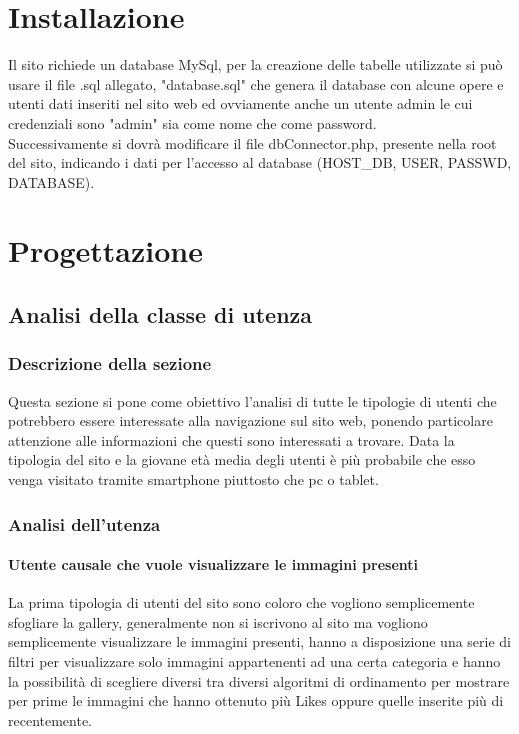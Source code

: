 \documentclass[openany, a4paper, 12pt]{report}
\begin{document}
	\chapter{Installazione}
	Il sito richiede un database MySql, per la creazione delle tabelle utilizzate si può usare il file .sql allegato, "database.sql" che genera il database con alcune opere e utenti dati inseriti nel sito web ed ovviamente anche un utente admin le cui credenziali sono "admin" sia come nome che come password.\\
	Successivamente si dovrà modificare il file dbConnector.php, presente nella root del sito, indicando i dati per l'accesso al database (HOST\_DB, USER, PASSWD, DATABASE).\\
	
	\chapter{Progettazione}

	\section{Analisi della classe di utenza}

		\subsection{Descrizione della sezione}
		Questa sezione si pone come obiettivo l'analisi di tutte le tipologie di utenti che potrebbero essere interessate alla navigazione sul sito web, ponendo particolare attenzione alle informazioni che questi sono interessati a trovare. Data la tipologia del sito e la giovane età media degli utenti è più probabile che esso venga visitato tramite smartphone piuttosto che pc o tablet.\\
		\subsection{Analisi dell'utenza}
		\subsubsection{Utente causale che vuole visualizzare le immagini presenti}
		La prima tipologia di utenti del sito sono coloro che vogliono semplicemente sfogliare la gallery, generalmente non si iscrivono al sito ma vogliono semplicemente visualizzare le immagini presenti, hanno a disposizione una serie di filtri per visualizzare solo immagini appartenenti ad una certa categoria e hanno la possibilità di scegliere diversi tra diversi algoritmi di ordinamento per mostrare per prime le immagini che hanno ottenuto più Likes oppure quelle inserite più di recentemente.\\
\end{document}
